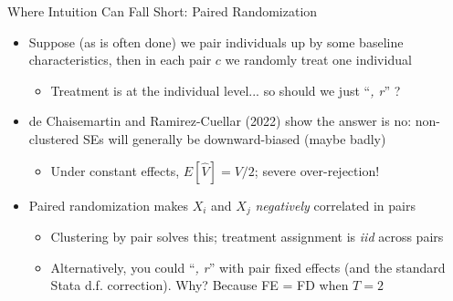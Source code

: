 \documentclass[11pt,english]{beamer}
\begin{document}
\begin{frame}{Where Intuition Can Fall Short: Paired Randomization}

\begin{itemize}
\item Suppose (as is often done) we pair individuals up by some baseline characteristics, then in each pair $c$ we randomly treat one individual\smallskip
\begin{itemize}
\item Treatment is at the individual level... so should we just ``\emph{, r}'' ?
\end{itemize}\bigskip\pause{}

\item de Chaisemartin and Ramirez-Cuellar (2022) show the answer is no: non-clustered SEs will generally be downward-biased (maybe badly)\smallskip
\begin{itemize}
\item Under constant effects, $E[\hat{V}]=V/2$; severe over-rejection!  
\end{itemize}\bigskip\pause{}

\item Paired randomization makes $X_i$ and $X_j$ \emph{negatively} correlated in pairs\smallskip
\begin{itemize}
\item Clustering by pair solves this; treatment assignment is \emph{iid} across pairs \smallskip\pause{}
\item Alternatively, you could  ``\emph{, r}'' with pair fixed effects (and the standard Stata d.f. correction). Why?\pause{} Because FE = FD when $T=2$
\end{itemize}
\end{itemize}

\end{frame}
\end{document}
